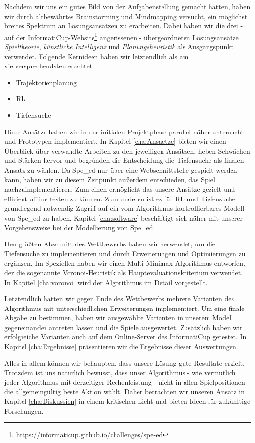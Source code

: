 Nachdem wir uns ein gutes Bild von der Aufgabenstellung gemacht hatten, haben wir durch altbewährtes Brainstorming und Mindmapping versucht, ein möglichst breites Spektrum an Lösungsansätzen zu erarbeiten. Dabei haben wir die drei - auf der InformatiCup-Website\footnote{https://informaticup.github.io/challenges/spe-ed} angerissenen - übergeordneten Lösungsansätze \textit{Spieltheorie}, \textit{künstliche Intelligenz} und \textit{Planungsheuristik} als Ausgangspunkt verwendet. Folgende Kernideen haben wir letztendlich als am vielversprechendsten erachtet:
\begin{itemize}
    \item Trajektorienplanung
    \item \acrfull{RL}
    \item Tiefensuche
\end{itemize}
Diese Ansätze haben wir in der initialen Projektphase parallel näher untersucht und Prototypen implementiert. In Kapitel \ref{cha:Ansaetze} bieten wir einen Überblick über verwandte Arbeiten zu den jeweiligen Ansätzen, heben Schwächen und Stärken hervor und begründen die Entscheidung die Tiefensuche als finalen Ansatz zu wählen. Da Spe\_ed nur über eine Webschnittstelle gespielt werden kann, haben wir zu diesem Zeitpunkt außerdem entschieden, das Spiel nachzuimplementieren. Zum einen ermöglicht das unsere Ansätze gezielt und effizient offline testen zu können. Zum anderen ist es für \acrshort{RL} und Tiefensuche grundlegend notwendig Zugriff auf ein vom Algorithmus kontrollierbares Modell von Spe\_ed zu haben. Kapitel \ref{cha:software} beschäftigt sich näher mit unserer Vorgehensweise bei der Modellierung von Spe\_ed.

Den größten Abschnitt des Wettbewerbs haben wir verwendet, um die Tiefensuche zu implementieren und durch Erweiterungen und Optimierungen zu ergänzen. Im Speziellen haben wir einen Multi-Minimax-Algorithmus entworfen, der die sogenannte Voronoi-Heuristik als Hauptevaluationskriterium verwendet. In Kapitel \ref{cha:voronoi} wird der Algorithmus im Detail vorgestellt.

Letztendlich hatten wir gegen Ende des Wettbewerbs mehrere Varianten des Algorithmus mit unterschiedlichen Erweiterungen implementiert. Um eine finale Abgabe zu bestimmen, haben wir ausgewählte Varianten in unserem Modell gegeneinander antreten lassen und die Spiele ausgewertet. Zusätzlich haben wir erfolgreiche Varianten auch auf dem Online-Server des InformatiCup getestet. In Kapitel \ref{cha:Ergebnisse} präsentieren wir die Ergebnisse dieser Auswertungen.

Alles in allem können wir behaupten, dass unsere Lösung gute Resultate erzielt. Trotzdem ist uns natürlich bewusst, dass unser Algorithmus - wie vermutlich jeder Algorithmus mit derzeitiger Rechenleistung - nicht in allen Spielpositionen die allgemeingültig beste Aktion wählt. Daher betrachten wir unseren Ansatz in Kapitel \ref{cha:Diskussion} in einem kritischen Licht und bieten Ideen für zukünftige Forschungen.

